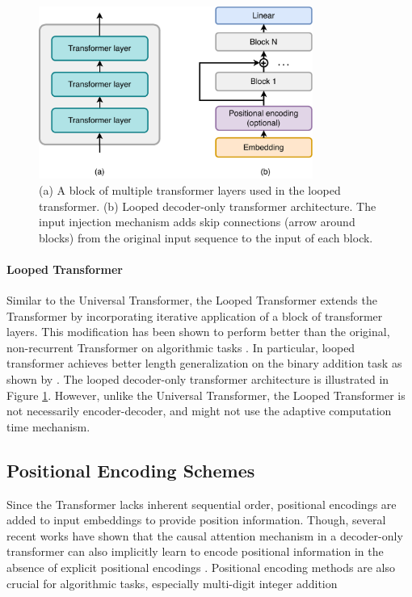\begin{figure}[h!]
    \centering
    \includegraphics[width=0.8\textwidth]{fig/looped_transformer.pdf}
    \caption{(a) A block of multiple transformer layers used in the looped transformer. (b) Looped decoder-only transformer architecture. The input injection mechanism adds skip connections (arrow around blocks) from the original input sequence to the input of each block.}
    \label{fig:looped_transformer}
\end{figure}

\paragraph{Looped Transformer}
Similar to the Universal Transformer, the Looped Transformer \parencite{yang_looped_2023} extends the Transformer by incorporating iterative application of a block of transformer layers. This modification has been shown to perform better than the original, non-recurrent Transformer on algorithmic tasks \parencite{csordas_systematic_2023,yang_looped_2023}. In particular, looped transformer achieves better length generalization on the binary addition task as shown by \cite{fan_looped_2024}. The looped decoder-only transformer architecture is illustrated in Figure \ref{fig:looped_transformer}. However, unlike the Universal Transformer, the Looped Transformer is not necessarily encoder-decoder, and might not use the adaptive computation time mechanism.

\subsection{Positional Encoding Schemes}\label{subsec:positional_encoding}

Since the Transformer lacks inherent sequential order, positional encodings are added to input embeddings to provide position information. Though, several recent works have shown that the causal attention mechanism in a decoder-only transformer can also implicitly learn to encode positional information in the absence of explicit positional encodings \parencite{haviv_transformer_2022,zuo_breaking_2024,zhou_transformers_2024}. Positional encoding methods are also crucial for algorithmic tasks, especially multi-digit integer addition \parencite{shen_positional_2023,kazemnejad_impact_2023,ruoss_randomized_2023}

